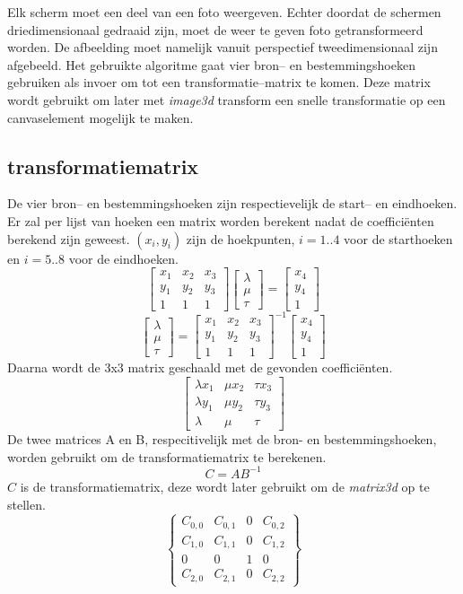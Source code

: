 
	Elk scherm moet een deel van een foto weergeven. Echter doordat de schermen driedimensionaal gedraaid zijn, moet de weer te geven foto getransformeerd worden. De afbeelding moet namelijk vanuit perspectief tweedimensionaal zijn afgebeeld. Het gebruikte algoritme gaat vier bron-- en bestemmingshoeken gebruiken als invoer om tot een transformatie--matrix te komen. Deze matrix wordt gebruikt om later met {\it image3d} transform een snelle transformatie op een canvaselement mogelijk te maken.


\subsection{transformatiematrix}
De vier bron-- en bestemmingshoeken zijn respectievelijk de start-- en eindhoeken. Er zal per lijst van hoeken een matrix worden berekent nadat de coefficiënten berekend zijn geweest. $(x_i, y_i)$ zijn de hoekpunten, $i = 1..4$ voor de starthoeken en $i = 5..8$ voor de eindhoeken. \cite{redrawImageFrom3dPerspectiveTo2d}
$$ \begin{bmatrix}
x_1 & x_2 & x_3 \\ y_1 & y_2 & y_3 \\ 1 & 1 & 1
\end{bmatrix} \begin{bmatrix}
\lambda \\ \mu \\ \tau
\end{bmatrix} =
\begin{bmatrix}
x_4 \\ y_4 \\ 1
\end{bmatrix}
$$
$$ \begin{bmatrix}
\lambda \\ \mu \\ \tau
\end{bmatrix} =\begin{bmatrix}
x_1 & x_2 & x_3 \\ y_1 & y_2 & y_3 \\ 1 & 1 & 1
\end{bmatrix}^{-1}
\begin{bmatrix}
x_4 \\ y_4 \\ 1
\end{bmatrix}
$$
Daarna wordt de 3x3 matrix geschaald met de gevonden coefficiënten.
$$
\begin{bmatrix}
\lambda x_1 & \mu x_2 & \tau x_3 \\ \lambda y_1 & \mu y_2 & \tau y_3 \\ \lambda & \mu & \tau
\end{bmatrix}
$$
De twee matrices A en B, respecitivelijk met de bron- en bestemmingshoeken, worden gebruikt om de transformatiematrix te berekenen.
$$ C = AB^{-1}$$
$C$ is de transformatiematrix, deze wordt later gebruikt om de {\it matrix3d} op te stellen. \cite{projectiveTransformation}
$$
\begin{Bmatrix}
C_{0,0}	& 	C_{0,1}	&	0	&	C_{0,2} 	\\
C_{1,0}	&	C_{1,1} 	&	0	&	C_{1,2} 	\\
0		&	0		&	1	&	0		\\
C_{2,0}	&	C_{2,1}	&	0	&	C_{2,2}
\end{Bmatrix}
$$
